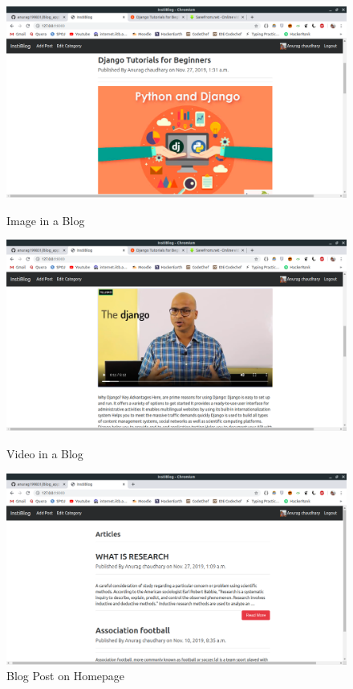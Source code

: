 \documentclass[oneside,a4paper,12pt]{article}
\begin{document}
\newpage
\begin{figure}[H]
\centering
    \includegraphics[scale=0.2]{SS3.png}
    \caption{Image in a Blog }
    \vspace{1em}
    \includegraphics[scale=0.2]{SS4.png}
    \caption{Video in a Blog}
    \vspace{1em}
    \includegraphics[scale=0.2]{SS5.png}
    \caption{Blog Post on Homepage}
    \end{figure}
\end{document}
